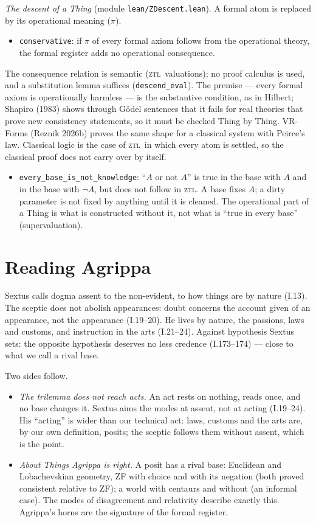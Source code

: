 \documentclass[11pt,a4paper]{article}
\newcommand{\ZTL}{\textsc{ztl}}
\newcommand{\code}[1]{\texttt{#1}}
\begin{document}
\emph{The descent of a Thing} (module \code{lean/ZDescent.lean}). A formal atom is replaced by its operational meaning
($\pi$).
\begin{itemize}
\item \code{conservative}: if $\pi$ of every formal axiom follows from the operational theory, the formal register adds
  no operational consequence.
\end{itemize}
The consequence relation is semantic (\ZTL\ valuations); no proof calculus is used, and a substitution lemma
suffices (\code{descend\_eval}). The premise --- every formal axiom is operationally harmless --- is the substantive
condition, as in Hilbert; Shapiro (1983) shows through Gödel sentences that it fails for real theories that prove new
consistency statements, so it must be checked Thing by Thing. VR-Forms (Reznik 2026b) proves the same shape
for a classical system with Peirce's law. Classical logic is the case of \ZTL\ in which every atom is settled, so the
classical proof does not carry over by itself.
\begin{itemize}
\item \code{every\_base\_is\_not\_knowledge}: ``$A$ or not $A$'' is true in the base with $A$ and in the base with
  $\neg A$, but does not follow in \ZTL. A base fixes $A$; a dirty parameter is not fixed by anything until it is
cleaned. The operational part of a
  Thing is what is constructed without it, not what is ``true in every base'' (supervaluation).
\end{itemize}

\section{Reading Agrippa}

Sextus calls dogma assent to the non-evident, to how things are by nature (I.13). The sceptic does not abolish
appearances: doubt concerns the account given of an appearance, not the appearance (I.19--20). He lives by nature,
the passions, laws and customs, and instruction in the arts (I.21--24). Against hypothesis Sextus sets: the opposite
hypothesis deserves no less credence (I.173--174) --- close to what we call a rival base.

Two sides follow.
\begin{itemize}
\item \emph{The trilemma does not reach acts.} An act rests on nothing, reads once, and no base changes it. Sextus
  aims the modes at assent, not at acting (I.19--24). His ``acting'' is wider than our technical act: laws, customs
  and the arts are, by our own definition, posits; the sceptic follows them without assent, which is the point.
\item \emph{About Things Agrippa is right.} A posit has a rival base: Euclidean and Lobachevskian geometry, ZF with
  choice and with its negation (both proved consistent relative to ZF); a world with centaurs and without (an
  informal case). The modes of disagreement and relativity
  describe exactly this. Agrippa's horns are the signature of the formal register.
\end{itemize}
\end{document}
